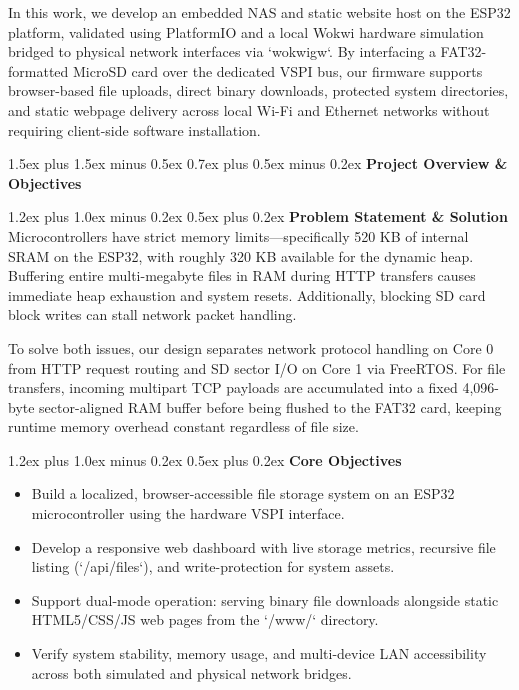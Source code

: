 \documentclass[conference]{IEEEtran}
\makeatletter
\renewcommand\section{\@startsection{section}{1}{\z@}%
  {1.5ex plus 1.5ex minus 0.5ex}%
  {0.7ex plus 0.5ex minus 0.2ex}%
  {\normalfont\normalsize\bfseries\centering}}
\renewcommand\subsection{\@startsection{subsection}{2}{\z@}%
  {1.2ex plus 1.0ex minus 0.2ex}%
  {0.5ex plus 0.2ex}%
  {\normalfont\normalsize\bfseries}}
\makeatother
\begin{document}
In this work, we develop an embedded NAS and static website host on the ESP32 platform, validated using PlatformIO and a local Wokwi hardware simulation bridged to physical network interfaces via `wokwigw`. By interfacing a FAT32-formatted MicroSD card over the dedicated VSPI bus, our firmware supports browser-based file uploads, direct binary downloads, protected system directories, and static webpage delivery across local Wi-Fi and Ethernet networks without requiring client-side software installation.

\section{\textbf{Project Overview \& Objectives}}

\subsection{\textbf{Problem Statement \& Solution}}
Microcontrollers have strict memory limits—specifically 520 KB of internal SRAM on the ESP32, with roughly 320 KB available for the dynamic heap. Buffering entire multi-megabyte files in RAM during HTTP transfers causes immediate heap exhaustion and system resets. Additionally, blocking SD card block writes can stall network packet handling.

To solve both issues, our design separates network protocol handling on Core 0 from HTTP request routing and SD sector I/O on Core 1 via FreeRTOS. For file transfers, incoming multipart TCP payloads are accumulated into a fixed 4,096-byte sector-aligned RAM buffer before being flushed to the FAT32 card, keeping runtime memory overhead constant regardless of file size.

\subsection{\textbf{Core Objectives}}
\begin{itemize}
    \item Build a localized, browser-accessible file storage system on an ESP32 microcontroller using the hardware VSPI interface.
    \item Develop a responsive web dashboard with live storage metrics, recursive file listing (`/api/files`), and write-protection for system assets.
    \item Support dual-mode operation: serving binary file downloads alongside static HTML5/CSS/JS web pages from the `/www/` directory.
    \item Verify system stability, memory usage, and multi-device LAN accessibility across both simulated and physical network bridges.
\end{itemize}
\end{document}
